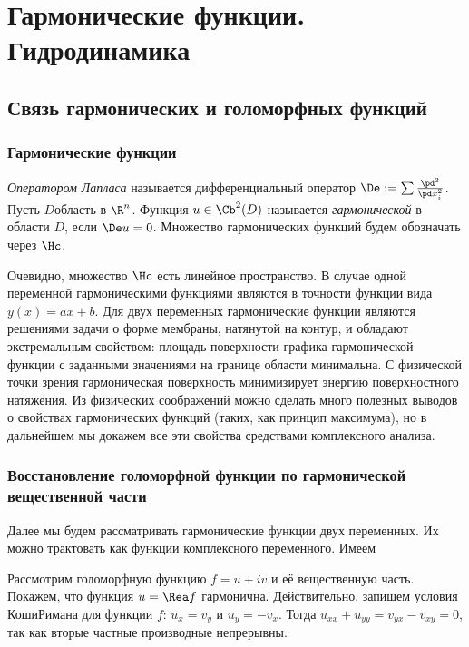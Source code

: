 \documentclass[a4paper]{article}
\begin{document}
\pagebreak

\section{Гармонические функции. Гидродинамика}

\subsection{Связь гармонических и голоморфных функций}

\subsubsection{Гармонические функции}

\begin{df}
\emph{Оператором Лапласа} называется дифференциальный оператор $\De := \sum \frac{\pd^2}{\pd x_i^2}$.
Пусть $D$\т область в $\R^n$. Функция $u\in \Cb^2(D)$ называется \emph{гармонической} в области $D$,
если $\De u = 0$. Множество гармонических функций будем обозначать через $\Hc$.
\end{df}

Очевидно, множество $\Hc$ есть линейное пространство. В случае одной переменной гармоническими функциями
являются в точности функции вида $y(x) = ax+b$. Для двух переменных гармонические функции являются решениями
задачи о форме мембраны, натянутой на контур, и обладают экстремальным  свойством:
площадь поверхности графика гармонической функции с заданными значениями на границе области минимальна.
С физической точки зрения гармоническая поверхность минимизирует энергию поверхностного натяжения. Из
физических соображений можно сделать много полезных выводов о свойствах гармонических функций (таких, как
принцип максимума), но в дальнейшем мы докажем все эти свойства средствами комплексного анализа.

\subsubsection{Восстановление голоморфной функции по гармонической вещественной части}

Далее мы будем рассматривать гармонические функции двух переменных. Их можно трактовать как функции комплексного
переменного. Имеем

Рассмотрим голоморфную функцию $f=u+iv$ и её вещественную часть. Покажем, что функция $u = \Rea f$ гармонична.
Действительно, запишем условия Коши\ч Римана для функции $f$: $u_x = v_y$ и $u_y=-v_x$. Тогда
$u_{xx} + u_{yy}=v_{yx}-v_{xy}=0$, так как вторые частные производные непрерывны.
\end{document}

